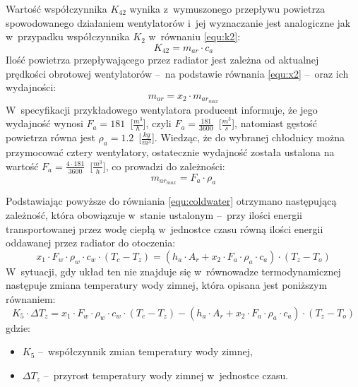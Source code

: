 Wartość współczynnika $K_{42}$ wynika z~wymuszonego przepływu powietrza
spowodowanego działaniem wentylatorów i~jej wyznaczanie jest analogiczne jak
w~przypadku współczynnika $K_2$ w~równaniu \eqref{equ:k2}:
\begin{equation}
    K_{42} = m_{ar} \cdot c_a
    \label{equ:k42}
\end{equation}
Ilość powietrza przepływającego przez radiator jest zależna od aktualnej
prędkości obrotowej wentylatorów --~na podstawie równania \eqref{equ:x2} --~oraz
ich wydajności:
\begin{equation}
    m_{ar} = x_2 \cdot m_{ar_{max}}
    \label{equ:mar}
\end{equation}
W~specyfikacji przykładowego wentylatora \cite{EKWBfan} producent informuje, że
jego wydajność wynosi $F_a = 181$~[$\frac{m^3}{h}$], czyli $F_a =
\frac{181}{3600}$~[$\frac{m^3}{s}$], natomiast gęstość powietrza równa jest
$\rho_a = 1.2$~[$\frac{kg}{m^3}$]. Wiedząc, że do wybranej chłodnicy można
przymocować cztery wentylatory, ostatecznie wydajność została ustalona na
wartość $F_a = \frac{4 \cdot 181}{3600}$~[$\frac{m^3}{h}$], co prowadzi do
zależności:
\begin{equation}
    m_{ar_{max}} = F_a \cdot \rho_a
    \label{equ:marmax}
\end{equation}

Podstawiając powyższe do równiania \eqref{equ:coldwater} otrzymano następującą
zależność, która obowiązuje w~stanie ustalonym --~przy ilości energii
transportowanej przez wodę ciepłą w~jednostce czasu równą ilości energii
oddawanej przez radiator do otoczenia:
\begin{equation}
    x_1 \cdot F_w \cdot \rho_w \cdot c_w \cdot \left( T_c - T_z \right) = \left(
    h_a \cdot A_r + x_2 \cdot F_a \cdot \rho_a \cdot c_a \right) \cdot \left(
    T_z - T_o \right)
    \label{equ:coldwaterfull}
\end{equation}
W~sytuacji, gdy układ ten nie znajduje się w~równowadze termodynamicznej
następuje zmiana temperatury wody zimnej, która opisana jest poniższym
równaniem:
\begin{equation}
    K_5 \cdot \Delta T_z = x_1 \cdot F_w \cdot \rho_w \cdot c_w \cdot \left( T_c
    - T_z \right) - \left( h_a \cdot A_r + x_2 \cdot F_a \cdot \rho_a \cdot c_a
    \right) \cdot \left( T_z - T_o \right)
    \label{equ:dtz}
\end{equation}
gdzie:
\begin{itemize}
    \item $K_5$ --~współczynnik zmian temperatury wody zimnej,
    \item $\Delta T_z$ --~przyrost temperatury wody zimnej w~jednostce czasu.
\end{itemize}

